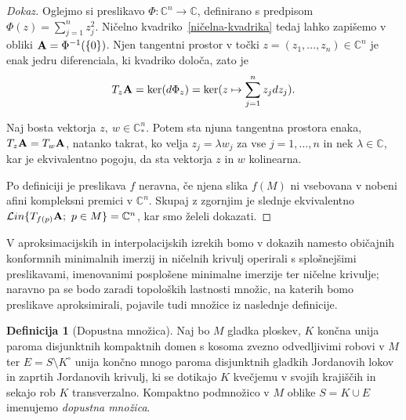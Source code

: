 \documentclass[12pt,a4paper,twoside]{article}
\theoremstyle{definition} %
\newtheorem{definicija}{Definicija}[section]
\newenvironment{dokaz}[1][Dokaz]{\begin{proof}[#1]}{\end{proof}}
\theoremstyle{plain} %
\numberwithin{equation}{section}  %
\newcommand{\C}{\mathbb C}
\begin{document}
\begin{dokaz}
Oglejmo si preslikavo 
$\Phi \colon \C^{n} \to \C$, definirano s predpisom $\Phi(z) = \sum_{j=1}^{n} z_{j}^{2}$.
Ničelno kvadriko~\eqref{ničelna-kvadrika} tedaj lahko zapišemo v obliki $\textbf{\textup{A}} = \Phi^{-1}( \{0 \} )$.
Njen tangentni prostor v točki $z = (z_{1}, \dots , z_{n}) \in \C^{n}$ je enak jedru diferenciala, ki kvadriko določa, zato je
\[ T_{z} \textbf{\textup{A}} = \ker (d \Phi_{z}) = \ker (z \mapsto \sum_{j=1}^{n} z_{j} dz_{j}). \]

Naj bosta vektorja $z, \ w \in \C_{*}^{n}$. Potem sta njuna tangentna prostora enaka, $ T_{z} \textbf{\textup{A}} = T_{w} \textbf{\textup{A}} $, natanko takrat, ko velja $z_{j} = \lambda w_{j}$ za vse $j = 1, \dots , n$ in nek $\lambda \in \C$, kar je ekvivalentno pogoju, da sta vektorja $z$ in $w$ kolinearna.

Po definiciji je preslikava $f$ neravna, če njena slika $f(M)$ ni vsebovana v nobeni afini kompleksni premici v $\C^{n}$. Skupaj z zgornjim je slednje ekvivalentno 
$ \mathcal{L}in \{T_{f(p)} \textbf{\textup{A}} ; \ p \in M \} = \C^{n}$, kar smo želeli dokazati.
\end{dokaz}

V aproksimacijskih in interpolacijskih izrekih bomo v dokazih namesto običajnih konformnih minimalnih imerzij in ničelnih krivulj operirali s splošnejšimi preslikavami, imenovanimi posplošene minimalne imerzije ter ničelne krivulje; naravno pa se bodo zaradi topoloških lastnosti množic, na katerih bomo preslikave aproksimirali, pojavile tudi množice iz naslednje definicije.

\begin{definicija} [Dopustna množica]
Naj bo $M$ gladka ploskev, $K$ končna unija paroma disjunktnih kompaktnih domen s kosoma zvezno odvedljivimi robovi v $M$ ter $E = S \setminus K^\circ$ unija končno mnogo paroma disjunktnih gladkih Jordanovih lokov in zaprtih Jordanovih krivulj, ki se dotikajo $K$ kvečjemu v svojih krajiščih in sekajo rob $K$ transverzalno. Kompaktno podmnožico v $M$ oblike $S = K \cup E$ imenujemo \emph{dopustna množica}.
\end{definicija}
\end{document}
